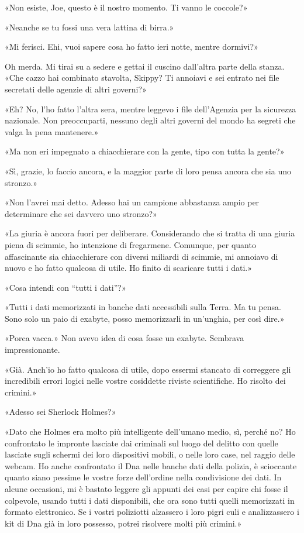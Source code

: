 «Non esiste, Joe, questo è il nostro momento. Ti vanno le coccole?»

«Neanche se tu fossi una vera lattina di birra.»

«Mi ferisci. Ehi, vuoi sapere cosa ho fatto ieri notte, mentre dormivi?»

Oh merda. Mi tirai su a sedere e gettai il cuscino dall'altra parte
della stanza. «Che cazzo hai combinato stavolta, Skippy? Ti annoiavi e
sei entrato nei file secretati delle agenzie di altri governi?»

«Eh? No, l'ho fatto l'altra sera, mentre leggevo i file dell'Agenzia per
la sicurezza nazionale. Non preoccuparti, nessuno degli altri governi
del mondo ha segreti che valga la pena mantenere.»

«Ma non eri impegnato a chiacchierare con la gente, tipo con tutta la
gente?»

«Sì, grazie, lo faccio ancora, e la maggior parte di loro pensa ancora
che sia uno stronzo.»

«Non l'avrei mai detto. Adesso hai un campione abbastanza ampio per
determinare che sei davvero uno stronzo?»

«La giuria è ancora fuori per deliberare. Considerando che si tratta di
una giuria piena di scimmie, ho intenzione di fregarmene. Comunque, per
quanto affascinante sia chiacchierare con diversi miliardi di scimmie,
mi annoiavo di nuovo e ho fatto qualcosa di utile. Ho finito di
scaricare tutti i dati.»

«Cosa intendi con ``tutti i dati''?»

«Tutti i dati memorizzati in banche dati accessibili sulla Terra. Ma tu
pensa. Sono solo un paio di exabyte, posso memorizzarli in un'unghia,
per così dire.»

«Porca vacca.» Non avevo idea di cosa fosse un exabyte. Sembrava
impressionante.

«Già. Anch'io ho fatto qualcosa di utile, dopo essermi stancato di
correggere gli incredibili errori logici nelle vostre cosiddette riviste
scientifiche. Ho risolto dei crimini.»

«Adesso sei Sherlock Holmes?»

«Dato che Holmes era molto più intelligente dell'umano medio, sì, perché
no? Ho confrontato le impronte lasciate dai criminali sul luogo del
delitto con quelle lasciate sugli schermi dei loro dispositivi mobili, o
nelle loro case, nel raggio delle webcam. Ho anche confrontato il Dna
nelle banche dati della polizia, è scioccante quanto siano pessime le
vostre forze dell'ordine nella condivisione dei dati. In alcune
occasioni, mi è bastato leggere gli appunti dei casi per capire chi
fosse il colpevole, usando tutti i dati disponibili, che ora sono tutti
quelli memorizzati in formato elettronico. Se i vostri poliziotti
alzassero i loro pigri culi e analizzassero i kit di Dna già in loro
possesso, potrei risolvere molti più crimini.»

